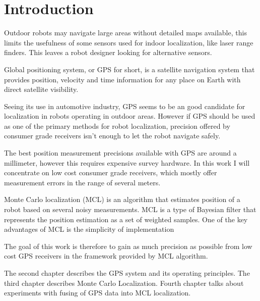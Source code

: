 \chapter{Introduction}


Outdoor robots may navigate large areas without detailed maps available, this limits
the usefulness of some sensors used for indoor localization, like laser range finders.
This leaves a robot designer looking for alternative sensors.

Global positioning system, or GPS for short, is a satellite navigation system that
provides position, velocity and time information for any place on Earth with direct
satellite visibility.

Seeing its use in automotive industry, GPS seems to be an good candidate for
localization in robots operating in outdoor areas.
However if GPS should be used as one of the primary methods for robot localization,
precision offered by consumer grade receivers isn't enough to let the robot navigate safely.

The best position measurement precisions available with GPS are around a millimeter,
however this requires expensive survey hardware.
In this work I will concentrate on low cost consumer grade receivers, which mostly
offer measurement errors in the range of several meters.


Monte Carlo localization (MCL) is an algorithm that estimates position of a robot
based on several noisy measurements.
MCL is a type of Bayesian filter that represents
the position estimation as a set of weighted samples.
One of the key advantages of MCL is the simplicity of implementation

The goal of this work is therefore to gain as much precision as possible from low cost
GPS receivers in the framework provided by MCL algorithm.

The second chapter describes the GPS system and its operating principles.
The third chapter describes Monte Carlo Localization.
Fourth chapter talks about experiments with fusing of GPS data into
MCL localization.
